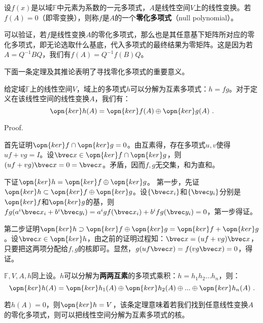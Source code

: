

\begin{issues}
\issueDraft 
\end{issues}

\begin{definition}{}
设$f(x)$是以域$\mathbb F$中元素为系数的一元多项式，$A$是线性空间$V$上的线性变换。若$f(A)=0$（即零变换），则称$f$是$A$的一个\textbf{零化多项式}（null polynomial）。
\end{definition}
可以验证，若$f$是线性变换$A$的零化多项式，那么也是其任意基下矩阵所对应的零化多项式，即无论选取什么基底，代入多项式的最终结果为零矩阵。这是因为若$A=Q^{-1}BQ$，我们有$f(A)=Q^{-1}f(B)Q$。


下面一条定理及其推论表明了寻找零化多项式的重要意义。
\begin{theorem}{}
给定域$\mathbb F$上的线性空间$V$，域上的多项式$h$可以分解为互素多项式：$h=fg$。对于定义在该线性空间的线性变换$A$，我们有：
\begin{equation}
\opn{ker}h(A)=\opn{ker}f(A)\oplus\opn{ker}g(A)~.
\end{equation}
\end{theorem}
Proof.

首先证明$\opn{ker}f\cap \opn{ker}g=0$。由互素得，存在多项式$u,v$使得$uf+vg=I$。设$\bvec x\in \opn{ker}f\cap \opn{ker}g$，则$(uf+vg)\bvec x=0=\bvec x$。矛盾，因而$f,g$无交集，和为直和。

下证$\opn{ker}h=\opn{ker}f\oplus\opn{ker}g$。
第一步，先证$\opn{ker}h\subset\opn{ker}f\oplus\opn{ker}g$。设$\{\bvec x_i\}$和$\{\bvec y_i\}$分别是$\opn{ker}f$和$\opn{ker}g$的基，则$fg(a^i\bvec x_i+b^i \bvec y_i)=a^igf(\bvec x_i)+b^ifg(\bvec y_i)=0$，第一步得证。

第二步证明$\opn{ker}h\supset\opn{ker}f\oplus\opn{ker}g=\opn{ker}f+\opn{ker}g$。设$\bvec x\in \opn{ker}h$，由之前的证明过程知：$\bvec x=(uf+vg)\bvec x$，只要把这两项分配给$f,g$的核即可。显然，$g(uf\bvec x)=f(vg\bvec x) =0$，得证。

\begin{corollary}{}\label{cor_nullpl_1}
$\mathbb F,V,A,h$同上设。$h$可以分解为\textbf{两两互素}的多项式乘积：$h=h_1h_2...h_n$，则：
\begin{equation}
\opn{ker}h(A)=\opn{ker}h_1(A)\oplus\opn{ker}h_2(A)\oplus...\oplus\opn{ker}h_n(A)~.
\end{equation}
\end{corollary}

若$h(A)=0$，则$\opn{ker} h=V$，该条定理意味着若我们找到任意线性变换$A$的零化多项式，则可以把线性空间分解为互素多项式的核。

